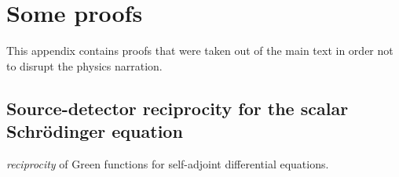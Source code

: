 
\chapter{Some proofs}  \label{sec:Proofs}

This appendix contains proofs that were taken out of the main text
in order not to disrupt the physics narration.

\section{Source-detector reciprocity for the scalar Schrödinger equation}
  \label{Sreci1}

\textit{reciprocity}
%
%
of Green functions for self-adjoint differential equations.

